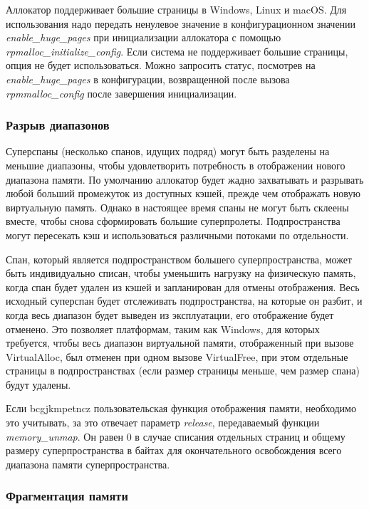 Аллокатор поддерживает большие страницы в Windows, Linux и macOS. Для использования надо передать ненулевое значение в конфигурационном значении \textit{enable\_huge\_pages} при инициализации аллокатора с помощью \textit{rpmalloc\_initialize\_config}. Если система не поддерживает большие страницы, опция не будет использоваться. Можно запросить статус, посмотрев на \textit{enable\_huge\_pages} в конфигурации, возвращенной после вызова \textit{rpmmalloc\_config} после завершения инициализации.

\subsubsection{Разрыв диапазонов}

Суперспаны (несколько спанов, идущих подряд) могут быть разделены на меньшие диапазоны, чтобы удовлетворить потребность в отображении нового диапазона памяти. По умолчанию аллокатор будет жадно захватывать и разрывать любой больший промежуток из доступных кэшей, прежде чем отображать новую виртуальную память. Однако в настоящее время спаны не могут быть склеены вместе, чтобы снова сформировать большие суперпролеты. Подпространства могут пересекать кэш и использоваться различными потоками по отдельности.

Спан, который является подпространством большего суперпространства, может быть индивидуально списан, чтобы уменьшить нагрузку на физическую память, когда спан будет удален из кэшей и запланирован для отмены отображения. Весь исходный суперспан будет отслеживать подпространства, на которые он разбит, и когда весь диапазон будет выведен из эксплуатации, его отображение будет отменено. Это позволяет платформам, таким как Windows, для которых требуется, чтобы весь диапазон виртуальной памяти, отображенный при вызове VirtualAlloc, был отменен при одном вызове VirtualFree, при этом отдельные страницы в подпространствах (если размер страницы меньше, чем размер спана) будут удалены.

Если bcgjkmpetncz пользовательская функция отображения памяти, необходимо это учитывать, за это отвечает параметр \textit{release}, передаваемый функции \textit{memory\_unmap}. Он равен 0 в случае списания отдельных страниц и общему размеру суперпространства в байтах для окончательного освобождения всего диапазона памяти суперпространства.

\subsubsection{Фрагментация памяти}

